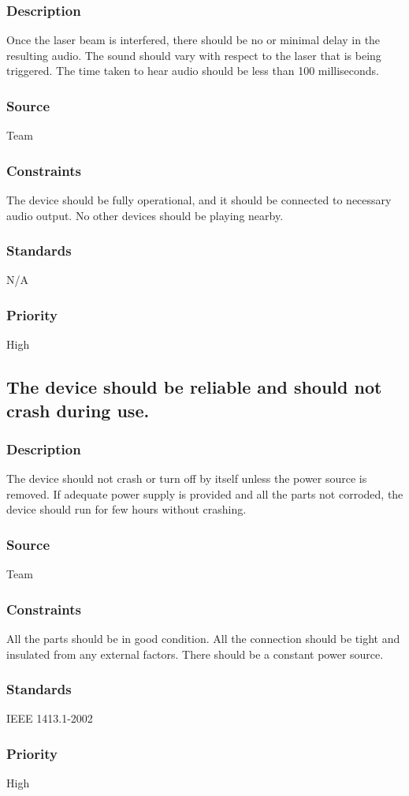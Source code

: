 \subsubsection{Description}
Once the laser beam is interfered, there should be no or minimal delay in the resulting audio. The sound should vary with respect to the laser that is being triggered. The time taken to hear audio should be less than 100 milliseconds.
\subsubsection{Source}
Team
\subsubsection{Constraints}
The device should be fully operational, and it should be connected to necessary audio output. No other devices should be playing nearby.
\subsubsection{Standards}
N/A
\subsubsection{Priority}
High

\subsection{The device should be reliable and should not crash during use.}
\subsubsection{Description}
The device should not crash or turn off by itself unless the power source is removed. If adequate power supply is provided and all the parts not corroded, the device should run for few hours without crashing. 
\subsubsection{Source}
Team
\subsubsection{Constraints}
All the parts should be in good condition. All the connection should be tight and insulated from any external factors. There should be a constant power source.
\subsubsection{Standards}
IEEE 1413.1-2002
\subsubsection{Priority}
High
